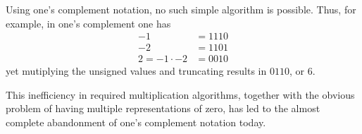 \documentclass[12pt]{article}
\begin{document}
Using one's complement notation, no such simple algorithm is possible. Thus, for example, in one's complement one has
\begin{align*}
-1&=1110\\
-2&=1101\\
2=-1\cdot -2 &= 0010
\end{align*}
yet mutiplying the unsigned values and truncating results in $0110$, or $6$. 

This inefficiency in required multiplication algorithms, together with the obvious problem of having multiple representations of zero, has led to the almost complete abandonment of one's complement notation today.
\end{document}
